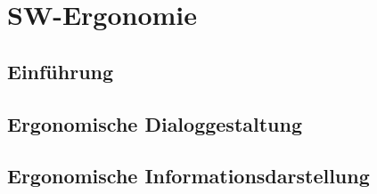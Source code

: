 \documentclass[a4paper]{article}
\title{\docTitle}
\author{Moritz}
\date{\today}
\begin{document}
\maketitle
\tableofcontents


\section{SW-Ergonomie}

\subsection{Einführung}

\subsection{Ergonomische Dialoggestaltung}

\subsection{Ergonomische Informationsdarstellung}
\end{document}

